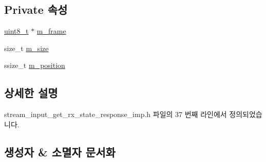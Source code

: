 \subsection*{Private 속성}
\begin{DoxyCompactItemize}
\item 
\hyperlink{stdint_8h_aba7bc1797add20fe3efdf37ced1182c5}{uint8\+\_\+t} $\ast$ \hyperlink{classavdecc__lib_1_1stream__input__get__rx__state__response__imp_a50417969cf438e7c8d698726bbbe2ff9}{m\+\_\+frame}
\item 
size\+\_\+t \hyperlink{classavdecc__lib_1_1stream__input__get__rx__state__response__imp_a0dc3c363255f193681c77b4d2a82e995}{m\+\_\+size}
\item 
ssize\+\_\+t \hyperlink{classavdecc__lib_1_1stream__input__get__rx__state__response__imp_af5e691c4a8a0feb07f48440b321206cd}{m\+\_\+position}
\end{DoxyCompactItemize}


\subsection{상세한 설명}


stream\+\_\+input\+\_\+get\+\_\+rx\+\_\+state\+\_\+response\+\_\+imp.\+h 파일의 37 번째 라인에서 정의되었습니다.



\subsection{생성자 \& 소멸자 문서화}
